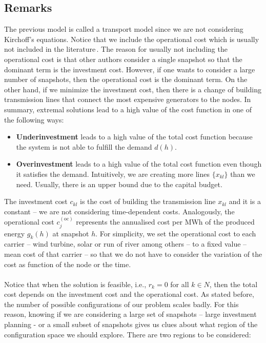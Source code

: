 \subsection{Remarks}
The previous model is called a transport model since we are not considering Kirchoff's equations. Notice that we include the operational cost which is usually not included in the literature\,\cite{Gomes2019}. The reason for usually not including the operational cost is that other authors consider a single snapshot so that the dominant term is the investment cost. However, if one wants to consider a large number of snapshots, then the operational cost is the dominant term. On the other hand, if we minimize the investment cost, then there is a change of building transmission lines that connect the most expensive generators to the nodes. In summary, extremal solutions lead to a high value of the cost function in one of the following ways:
\begin{itemize}
    \item \textbf{Underinvestment} leads to a high value of the total cost function because the system is not able to fulfill the demand $d(h)$.
    \item \textbf{Overinvestment} leads to a high value of the total cost function even though it satisfies the demand. Intuitively, we are creating more lines $\{x_{kl}\}$ than we need. Usually, there is an upper bound due to the capital budget.
\end{itemize}
The investment cost $c_{kl}$ is the cost of building the transmission line $x_{kl}$ and it is a constant -- we are not considering time-dependent costs. Analogously, the operational cost $c_{j}^{(\textrm{oc})}$ represents the annualised cost per MWh of the produced energy $g_{k}(h)$ at snapshot $h$. For simplicity, we set the operational cost to each carrier -- wind turbine, solar or run of river among others -- to a fixed value -- mean cost of that carrier -- so that we do not have to consider the variation of the cost as function of the node or the time.\\\\
Notice that when the solution is feasible, i.e., $r_k = 0$ for all $k\in N$, then the total cost depends on the investment cost and the operational cost. As stated before, the number of possible configurations of our problem scales badly. For this reason, knowing if we are considering a large set of snapshots -- large investment planning - or a small subset of snapshots gives us clues about what region of the configuration space we should explore. There are two regions to be considered:
